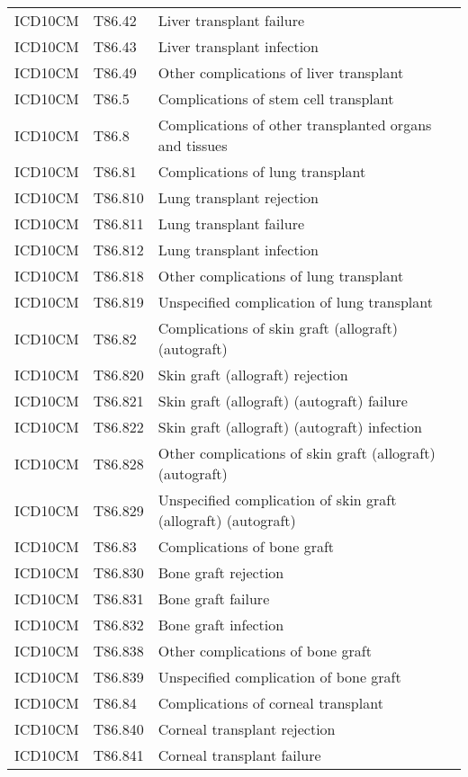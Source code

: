 \begin{table}[ht]
\begin{tabular}{lll}
  ICD10CM & T86.42 & Liver transplant failure \\ 
  ICD10CM & T86.43 & Liver transplant infection \\ 
  ICD10CM & T86.49 & Other complications of liver transplant \\ 
  ICD10CM & T86.5 & Complications of stem cell transplant \\ 
  ICD10CM & T86.8 & Complications of other transplanted organs and tissues \\ 
  ICD10CM & T86.81 & Complications of lung transplant \\ 
  ICD10CM & T86.810 & Lung transplant rejection \\ 
  ICD10CM & T86.811 & Lung transplant failure \\ 
  ICD10CM & T86.812 & Lung transplant infection \\ 
  ICD10CM & T86.818 & Other complications of lung transplant \\ 
  ICD10CM & T86.819 & Unspecified complication of lung transplant \\ 
  ICD10CM & T86.82 & Complications of skin graft (allograft) (autograft) \\ 
  ICD10CM & T86.820 & Skin graft (allograft) rejection \\ 
  ICD10CM & T86.821 & Skin graft (allograft) (autograft) failure \\ 
  ICD10CM & T86.822 & Skin graft (allograft) (autograft) infection \\ 
  ICD10CM & T86.828 & Other complications of skin graft (allograft) (autograft) \\ 
  ICD10CM & T86.829 & Unspecified complication of skin graft (allograft) (autograft) \\ 
  ICD10CM & T86.83 & Complications of bone graft \\ 
  ICD10CM & T86.830 & Bone graft rejection \\ 
  ICD10CM & T86.831 & Bone graft failure \\ 
  ICD10CM & T86.832 & Bone graft infection \\ 
  ICD10CM & T86.838 & Other complications of bone graft \\ 
  ICD10CM & T86.839 & Unspecified complication of bone graft \\ 
  ICD10CM & T86.84 & Complications of corneal transplant \\ 
  ICD10CM & T86.840 & Corneal transplant rejection \\ 
  ICD10CM & T86.841 & Corneal transplant failure \\ 

\end{tabular}
\end{table}
